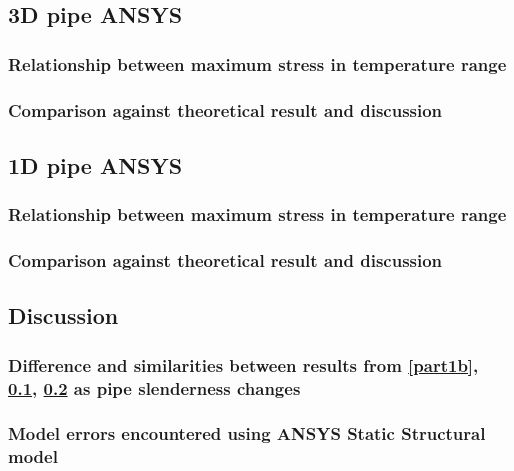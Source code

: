 \subsection{3D pipe ANSYS}\label{part1c}
\subsubsection{Relationship between maximum stress in temperature range}
\subsubsection{Comparison against theoretical result and discussion}
\subsection{1D pipe ANSYS}\label{part1d}
\subsubsection{Relationship between maximum stress in temperature range}
\subsubsection{Comparison against theoretical result and discussion}
\subsection{Discussion}
\subsubsection{Difference and similarities between results from \ref{part1b}, \ref{part1c}, \ref{part1d} as pipe slenderness changes}
\subsubsection{Model errors encountered using ANSYS Static Structural model}